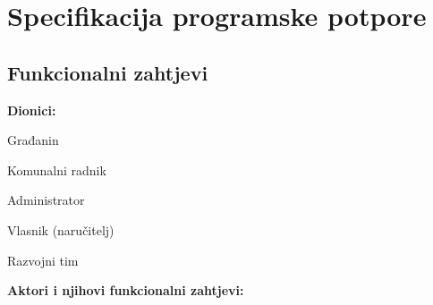 \chapter{Specifikacija programske potpore}
		
	\section{Funkcionalni zahtjevi}
			
			\noindent \textbf{Dionici:}
			
			\begin{packed_enum}
				
				\item Građanin
				\item Komunalni radnik			
				\item Administrator
				\item Vlasnik (naručitelj)
				\item Razvojni tim
				
				
			\end{packed_enum}
			
			\noindent \textbf{Aktori i njihovi funkcionalni zahtjevi:}
			
